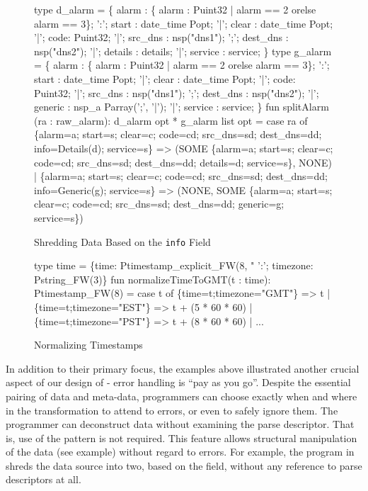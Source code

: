 \documentclass{entcs}
\begin{document}
\begin{figure}
  \centering
  \begin{code}
type d_alarm = \{
       alarm    :  \{ alarm : Puint32 | alarm == 2 
                                        orelse alarm == 3\};
 ':';  start :  date_time Popt;
 '|';  clear :  date_time Popt;
 '|';  code: Puint32;
 '|';  src_dns  :  nsp("dns1");
 ';';  dest_dns :  nsp("dns2");
 '|';  details  : details;
 '|';  service  :  service;
\}
\mbox{}
type g_alarm = \{
       alarm    :  \{ alarm : Puint32 | alarm == 2 
                                        orelse alarm == 3\};
 ':';  start :  date_time Popt;
 '|';  clear :  date_time Popt;
 '|';  code: Puint32;
 '|';  src_dns  :  nsp("dns1");
 ';';  dest_dns :  nsp("dns2");
 '|';  generic  : nsp_a Parray(';', '|');
 '|';  service  :  service;
\}
\mbox{}
fun splitAlarm (ra : raw_alarm): 
    d_alarm opt * g_alarm list opt
  = case ra of
        \{alarm=a; start=s; clear=c; code=cd; 
         src_dns=sd; dest_dns=dd; 
         info=Details(d); service=s\} 
        => 
        (SOME \{alarm=a; start=s; clear=c; 
               code=cd; src_dns=sd; dest_dns=dd; 
               details=d; service=s\}, 
         NONE)
      | \{alarm=a; start=s; clear=c; code=cd; 
         src_dns=sd; dest_dns=dd; 
         info=Generic(g); service=s\} 
        => 
        (NONE,
         SOME \{alarm=a; start=s; clear=c; 
               code=cd; src_dns=sd; dest_dns=dd; 
               generic=g; service=s\})    
  \end{code}
  \label{fig:ex-no-err-check}
  \caption{Shredding \darkstar{} Data Based on the {\tt info} Field}
\end{figure}

\begin{figure}
  \centering
  \begin{code}
type time = 
  \{time: Ptimestamp_explicit_FW(8, "%
   ':'; timezone: Pstring_FW(3)\}
\mbox{}
fun normalizeTimeToGMT(t : time): Ptimestamp_FW(8) =
    case t of
      \{time=t;timezone="GMT"\} => t
    | \{time=t;timezone="EST"\} => t + (5 * 60 * 60)
    | \{time=t;timezone="PST"\} => t + (8 * 60 * 60)
    | ...    
  \end{code}
  \caption{Normalizing Timestamps}
  \label{fig:ex-normalize}
\end{figure}

In addition to their primary focus, the examples above illustrated
another crucial aspect of our design of \datatype{} - error handling
is ``pay as you go''.  Despite the essential pairing of data and
meta-data, programmers can choose exactly when and where in the
transformation to attend to errors, or even to safely ignore them. The
programmer can deconstruct data without examining the parse
descriptor. That is, use of the pattern  is not
required. This feature allows structural manipulation of the data (see
\darkstar{} example) without regard to errors. For example, the
program in  shreds the \darkstar{} data
source into two, based on the  field, without any reference
to parse descriptors at all.
\end{document}
